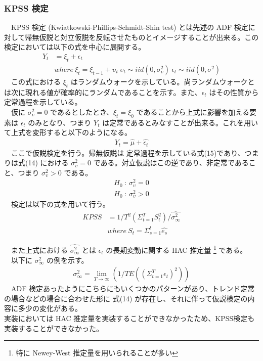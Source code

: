 \documentclass[dvipdfmx]{scrartcl}
\begin{document}
\subsubsection{KPSS 検定}
\label{sec:org4702c75}
　KPSS 検定 (Kwiatkowski-Phillips-Schmidt-Shin test) とは先述の ADF 検定に対して帰無仮説と対立仮説を反転させたものとイメージすることが出来る。この検定においては以下の式を中心に展開する。\\
\begin{align}
Y_t &= \xi_t + \epsilon_t \nonumber \\
 &where \ \xi_t = \xi_{t-1} + \upsilon_t \ \upsilon_t \sim iid(0, \sigma_{\upsilon}^2)\  \epsilon_t \sim iid(0, \sigma^2)
\end{align}
　この式における \(\xi_t\) はランダムウォークを示している。尚ランダムウォークとは次に現れる値が確率的にランダムであることを示す。また、\(\epsilon_t\) はその性質から定常過程を示している。\\
　仮に \(\sigma_{\upsilon}^2 = 0\) であるとしたとき、\(\xi_t = \xi_0\) であることから上式に影響を加える要素は \(\epsilon_t\) のみとなり、つまり \(Y_t\) は定常であるとみなすことが出来る。これを用いて上式を変形すると以下のようになる。\\
\begin{align}
Y_t = \hat{\mu} + \hat{\epsilon_t}
\end{align}
　ここで仮説検定を行う。帰無仮説は 定常過程を示している式(15)であり、つまりは式(14) における \(\sigma_{\upsilon}^2 = 0\) である。対立仮説はこの逆であり、非定常であること、つまり \(\sigma_{\upsilon}^2 > 0\) である。\\
\begin{align}
H_0 \ :\ \sigma_{\upsilon}^2 = 0 \\
H_0 \ :\ \sigma_{\upsilon}^2 > 0
\end{align}
　検定は以下の式を用いて行う。\\
\begin{align}
KPSS &= 1/T^2 (\Sigma^{T}_{t = 1}S_t^2)/ \hat{\sigma^2_\infty} \nonumber \\ 
&where\  S_t = \Sigma_{s=1}^t \hat{e_s} 
\end{align}

　また上式における \(\hat{\sigma^2_\infty}\) とは \(\epsilon_t\) の長期変動に関する HAC 推定量 \footnote{特に Newey-West 推定量を用いられることが多い} である。\\
　以下に \(\sigma^2_\infty\) の例を示す。\cite{STAN:STAN272}
\begin{align}
\sigma^2_\infty = \lim_{T \rightarrow \infty} (1/T E((\Sigma_{t=1}^T \epsilon_t)^2))
\end{align}
　ADF 検定あったようにこちらにもいくつかのパターンがあり、トレンド定常の場合などの場合に合わせた形に 式(14) が存在し、それに伴って仮説検定の内容に多少の変化がある。\\
実装においては HAC 推定量を実装することができなかったため、KPSS検定も実装することができなかった。\\
\end{document}

